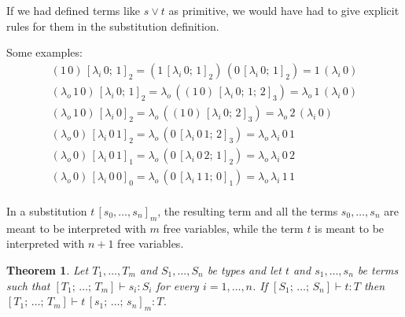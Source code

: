 \documentclass[a4paper]{article}
\newtheorem{theorem}{Theorem}
\theoremstyle{definition}
\newcommand*{\typrp}{o}
\newcommand*{\tyind}{i}
\newcommand*{\tpquant}[2]{#1_{#2}}
\newcommand*{\tmapp}[2]{#1 \, #2}
\newcommand*{\tmabs}[2]{\tpquant{\lambda}{#1} \, #2}
\newcommand*{\hastype}[3]{#1 \vdash #2 : #3}
\newcommand*{\subst}[3]{#1 \, [#3]_{#2}}
\newcommand*{\listdelim}[1]{[#1]}
\newcommand*{\listsep}{; \,}
\newcommand*{\dotlist}[3]{#1_{#2}, \dots, #1_{#3}}
\begin{document}
If we had defined terms like $s \lor t$ as primitive, we would have had to give explicit rules for them in the substitution definition.

Some examples:
\begin{gather*}
    \subst{(\tmapp{1}{0})}{2}{\tmabs{\tyind}{0} \listsep 1} =
    \tmapp{(\subst{1}{2}{\tmabs{\tyind}{0} \listsep 1})}{(\subst{0}{2}{\tmabs{\tyind}{0} \listsep 1})} =
    \tmapp{1}{(\tmabs{\tyind}{0})} \\
    \subst{(\tmabs{\typrp}{\tmapp{1}{0}})}{2}{\tmabs{\tyind}{0} \listsep 1} =
    \tmabs{\typrp}{(\subst{(\tmapp{1}{0})}{3}{\tmabs{\tyind}{0} \listsep 1 \listsep 2})} =
    \tmabs{\typrp}{\tmapp{1}{(\tmabs{\tyind}{0})}} \\
    \subst{(\tmabs{\typrp}{\tmapp{1}{0}})}{2}{\tmabs{\tyind}{0}} =
    \tmabs{\typrp}{(\subst{(\tmapp{1}{0})}{3}{\tmabs{\tyind}{0} \listsep 2})} =
    \tmabs{\typrp}{\tmapp{2}{(\tmabs{\tyind}{0})}} \\
    \subst{(\tmabs{\typrp}{0})}{2}{\tmabs{\tyind}{\tmapp{0}{1}}} =
    \tmabs{\typrp}{(\subst{0}{3}{\tmabs{\tyind}{\tmapp{0}{1}} \listsep 2})} =
    \tmabs{\typrp}{\tmabs{\tyind}{\tmapp{0}{1}}} \\
    \subst{(\tmabs{\typrp}{0})}{1}{\tmabs{\tyind}{\tmapp{0}{1}}} =
    \tmabs{\typrp}{(\subst{0}{2}{\tmabs{\tyind}{\tmapp{0}{2}} \listsep 1})} =
    \tmabs{\typrp}{\tmabs{\tyind}{\tmapp{0}{2}}} \\
    \subst{(\tmabs{\typrp}{0})}{0}{\tmabs{\tyind}{\tmapp{0}{0}}} =
    \tmabs{\typrp}{(\subst{0}{1}{\tmabs{\tyind}{\tmapp{1}{1}} \listsep 0})} =
    \tmabs{\typrp}{\tmabs{\tyind}{\tmapp{1}{1}}} \\
\end{gather*}

In a substitution $\subst{t}{m}{s_0, \dots, s_n}$, the resulting term and all the terms $s_0, \dots, s_n$ are meant to be interpreted with $m$ free variables, while the term $t$ is meant to be interpreted with $n+1$ free variables.

\begin{theorem}
    Let $\dotlist{T}{1}{m}$ and $\dotlist{S}{1}{n}$ be types and let $t$ and $\dotlist{s}{1}{n}$ be terms such that $\hastype{\listdelim{T_1 \listsep \dots \listsep T_m}}{s_i}{S_i}$ for every $i = 1, \dots, n$.
    If $\hastype{\listdelim{S_1 \listsep \dots \listsep S_n}}{t}{T}$ then $\hastype{\listdelim{T_1 \listsep \dots \listsep T_m}}{\subst{t}{m}{s_1 \listsep \dots \listsep s_n}}{T}$.
\end{theorem}
\end{document}
